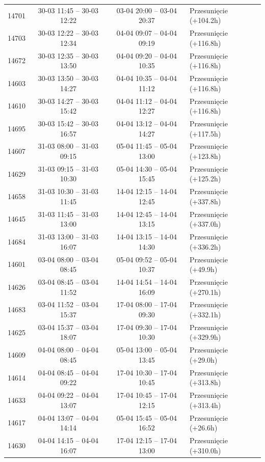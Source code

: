 \begin{table}[htbp]
\begin{tabular}{|r|c|c|l|}
14701 & 30-03 11:45 -- 30-03 12:22 & 03-04 20:00 -- 03-04 20:37 & Przesunięcie (+104.2h) \\ 
14703 & 30-03 12:22 -- 30-03 12:34 & 04-04 09:07 -- 04-04 09:19 & Przesunięcie (+116.8h) \\ 
14672 & 30-03 12:35 -- 30-03 13:50 & 04-04 09:20 -- 04-04 10:35 & Przesunięcie (+116.8h) \\ 
14603 & 30-03 13:50 -- 30-03 14:27 & 04-04 10:35 -- 04-04 11:12 & Przesunięcie (+116.8h) \\ 
14610 & 30-03 14:27 -- 30-03 15:42 & 04-04 11:12 -- 04-04 12:27 & Przesunięcie (+116.8h) \\ 
14695 & 30-03 15:42 -- 30-03 16:57 & 04-04 13:12 -- 04-04 14:27 & Przesunięcie (+117.5h) \\ 
14607 & 31-03 08:00 -- 31-03 09:15 & 05-04 11:45 -- 05-04 13:00 & Przesunięcie (+123.8h) \\ 
14629 & 31-03 09:15 -- 31-03 10:30 & 05-04 14:30 -- 05-04 15:45 & Przesunięcie (+125.2h) \\ 
14658 & 31-03 10:30 -- 31-03 11:45 & 14-04 12:15 -- 14-04 12:45 & Przesunięcie (+337.8h) \\ 
14645 & 31-03 11:45 -- 31-03 13:00 & 14-04 12:45 -- 14-04 13:15 & Przesunięcie (+337.0h) \\ 
14684 & 31-03 13:00 -- 31-03 16:07 & 14-04 13:15 -- 14-04 14:30 & Przesunięcie (+336.2h) \\ 
14601 & 03-04 08:00 -- 03-04 08:45 & 05-04 09:52 -- 05-04 10:37 & Przesunięcie (+49.9h) \\ 
14626 & 03-04 08:45 -- 03-04 11:52 & 14-04 14:54 -- 14-04 16:09 & Przesunięcie (+270.1h) \\ 
14683 & 03-04 11:52 -- 03-04 15:37 & 17-04 08:00 -- 17-04 09:30 & Przesunięcie (+332.1h) \\ 
14625 & 03-04 15:37 -- 03-04 18:07 & 17-04 09:30 -- 17-04 10:30 & Przesunięcie (+329.9h) \\ 
14609 & 04-04 08:00 -- 04-04 08:45 & 05-04 13:00 -- 05-04 13:45 & Przesunięcie (+29.0h) \\ 
14614 & 04-04 08:45 -- 04-04 09:22 & 17-04 10:30 -- 17-04 10:45 & Przesunięcie (+313.8h) \\ 
14633 & 04-04 09:22 -- 04-04 13:07 & 17-04 10:45 -- 17-04 12:15 & Przesunięcie (+313.4h) \\ 
14617 & 04-04 13:07 -- 04-04 14:14 & 05-04 15:45 -- 05-04 16:52 & Przesunięcie (+26.6h) \\ 
14630 & 04-04 14:15 -- 04-04 16:07 & 17-04 12:15 -- 17-04 13:00 & Przesunięcie (+310.0h) \\ 

\end{tabular}
\end{table}
